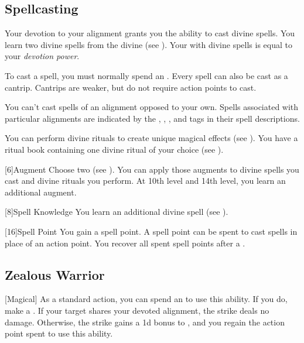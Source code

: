     \subsection{Spellcasting}

        Your devotion to your alignment grants you the ability to cast divine spells.
        You learn two divine spells from the divine  (see ).
        Your  with divine spells is equal to your \textit{devotion power}.

        To cast a spell, you must normally spend an .
        Every spell can also be cast as a cantrip.
        Cantrips are weaker, but do not require action points to cast.

        You can't cast spells of an alignment opposed to your own.
        Spells associated with particular alignments are indicated by the , , , and  tags in their spell descriptions.

        You can perform divine rituals to create unique magical effects (see ).
        You have a ritual book containing one divine ritual of your choice (see ).

        [6]{Augment}
        Choose two  (see ).
        You can apply those augments to divine spells you cast and divine rituals you perform.
        At 10th level and 14th level, you learn an additional augment.

        [8]{Spell Knowledge}
        You learn an additional divine spell (see ).

        [16]{Spell Point} 
        You gain a spell point.
        A spell point can be spent to cast spells in place of an action point.
        You recover all spent spell points after a .

    \subsection{Zealous Warrior}
        [Magical] As a standard action, you can spend an  to use this ability.
        If you do, make a .
        If your target shares your devoted alignment, the strike deals no damage.
        Otherwise, the strike gains a \plus1d bonus to , and you regain the action point spent to use this ability.


